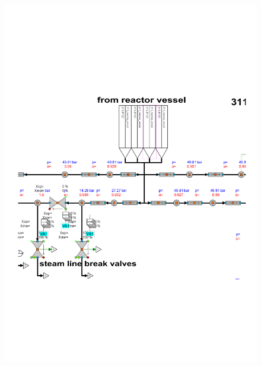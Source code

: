 \begin{frame}
\begin{figure}
\begin{minipage}{.5\textwidth}
			\includegraphics[width=\linewidth, trim={1cm 0cm 10cm 12cm}, clip]{./graphs/steam_pipe_quality.pdf}
		\end{minipage}
	\end{figure}

\end{frame}

